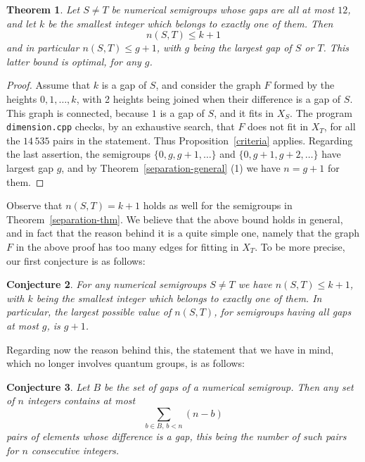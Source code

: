 \documentclass[11pt,a4paper]{article}
\newtheorem{thm}{Theorem}[section]
\newtheorem{conjecture}[thm]{Conjecture}
\begin{document}
\begin{thm}\label{separation-computer}
Let $S\neq T$ be numerical semigroups whose gaps are all at most $12$, and let $k$ be the smallest integer which belongs to exactly one of them. Then
\[
 n(S,T)\leq k+1
\]
and in particular $n(S,T)\leq g+1$, with $g$ being the largest gap of $S$ or $T$. This latter bound is optimal, for any $g$.
\end{thm}

\begin{proof}
Assume that $k$ is a gap of $S$, and consider the graph $F$ formed by the heights $0,1,\ldots,k$, with 2 heights being joined when their difference is a gap of $S$. This graph is connected, because $1$ is a gap of $S$, and it fits in $X_S$. The program \texttt{dimension.cpp} checks, by an exhaustive search, that $F$ does not fit in $X_T$, for all the $14\,535$ pairs in the statement. Thus Proposition~\ref{criteria} applies. Regarding the last assertion, the semigroups $\{0,g,g+1,\ldots\}$ and $\{0,g+1,g+2,\ldots\}$ have largest gap $g$, and by Theorem~\ref{separation-general} (1) we have $n=g+1$ for them.
\end{proof}

Observe that $n(S,T)=k+1$ holds as well for the semigroups in Theorem~\ref{separation-thm}. We believe that the above bound holds in general, and in fact that the reason behind it is a quite simple one, namely that the graph $F$ in the above proof has too many edges for fitting in $X_T$. To be more precise, our first conjecture is as follows:

\begin{conjecture}\label{conj-separation}
For any numerical semigroups $S\neq T$ we have $n(S,T)\leq k+1$, with $k$ being the smallest integer which belongs to exactly one of them. In particular, the largest possible value of $n(S,T)$, for semigroups having all gaps at most $g$, is $g+1$.
\end{conjecture}

Regarding now the reason behind this, the statement that we have in mind, which no longer involves quantum groups, is as follows:

\begin{conjecture}\label{conj-edges}
Let $B$ be the set of gaps of a numerical semigroup. Then any set of $n$ integers contains at most
\[
 \sum_{b\in B,\,b<n}(n-b)
\]
pairs of elements whose difference is a gap, this being the number of such pairs for $n$ consecutive integers.
\end{conjecture}
\end{document}
